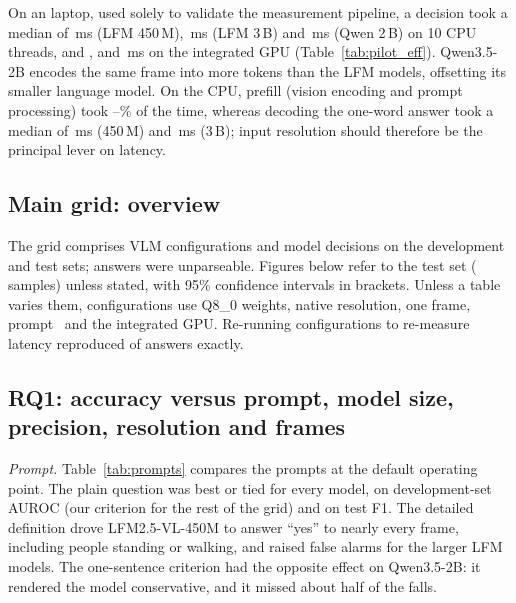 On an \PilotCpu{} laptop, used solely to validate the measurement pipeline, a decision took a median of \PilotSmallCpuMedianMs\,ms (LFM 450\,M), \PilotLargeCpuMedianMs\,ms (LFM 3\,B) and \PilotQwenCpuMedianMs\,ms (Qwen 2\,B) on 10 CPU threads, and \PilotSmallGpuMedianMs, \PilotLargeGpuMedianMs{} and \PilotQwenGpuMedianMs\,ms on the integrated GPU (Table~\ref{tab:pilot_eff}). Qwen3.5-2B encodes the same frame into more tokens than the LFM models, offsetting its smaller language model. On the CPU, prefill (vision encoding and prompt processing) took \PilotSmallCpuPrefillPct--\PilotLargeCpuPrefillPct\% of the time, whereas decoding the one-word answer took a median of \PilotSmallCpuDecodeMs\,ms (450\,M) and \PilotLargeCpuDecodeMs\,ms (3\,B); input resolution should therefore be the principal lever on latency.

\begin{table}[t]
\centering
\caption{Pilot efficiency on an \PilotCpu{} (\PilotRamGB\,GB, macOS \PilotOs, llama.cpp b\PilotLlamaBuild), prompt~\promptA, 30 timed requests after 3 warm-ups. Validates the pipeline only; main results are in Section~\ref{sec:results}.}
\label{tab:pilot_eff}
\footnotesize
\setlength{\tabcolsep}{3pt}

\end{table}

\subsection{Main grid: overview}
The grid comprises \RNConfigs{} VLM configurations and \RNDecisions{} model decisions on the development and test sets; \RNUnparsed{} answers were unparseable. Figures below refer to the test set (\BenchNTest{} samples) unless stated, with 95\% confidence intervals in brackets. Unless a table varies them, configurations use Q8\_0 weights, native resolution, one frame, prompt~\promptA{} and the integrated GPU. Re-running \RRetimeConfigs{} configurations to re-measure latency reproduced \RRetimeSame{} of \RRetimeTotal{} answers exactly.

\subsection{RQ1: accuracy versus prompt, model size, precision, resolution and frames}
\textit{Prompt.} Table~\ref{tab:prompts} compares the prompts at the default operating point. The plain question \promptA{} was best or tied for every model, on development-set AUROC (our criterion for the rest of the grid) and on test F1. The detailed definition \promptB{} drove LFM2.5-VL-450M to answer ``yes'' to nearly every frame, including people standing or walking, and raised false alarms for the larger LFM models. The one-sentence criterion \promptBtwo{} had the opposite effect on Qwen3.5-2B: it rendered the model conservative, and it missed about half of the falls.

